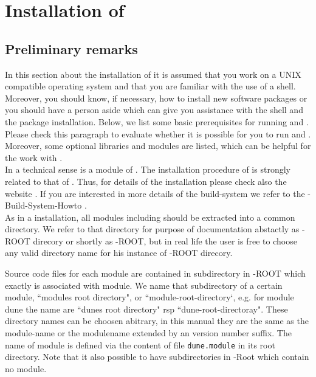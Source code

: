 \section{Installation of \Dumux} \label{install}
\subsection{Preliminary remarks}

In this section about the installation of \Dumux it is assumed that you work on a UNIX compatible operating system and that you are familiar with the use of a shell. 
Moreover, you should know,  if necessary, how to install new software packages or you should have a person aside which can give you assistance with the shell and the package installation. 
Below, we list some basic prerequisites for running \Dune and \Dumux. 
Please check this paragraph to evaluate whether it is possible for you to run \Dune and \Dumux. 
Moreover, some optional libraries and modules are listed, which can be helpful for the work with \Dumux. \\

In a technical sense \Dumux is a module of \Dune. 
The installation procedure of \Dumux is strongly related to that of \Dune. 
Thus, for details of the installation please check also the {\Dune} website \cite{DUNE-HP}. 
If you are interested in more details of the build-system we refer to the {\Dune}-Build-System-Howto \cite{DUNE-BS}.\\

As in a \Dune installation, all \Dune modules including \Dumux should be extracted into a common directory. We refer to that directory for purpose of documentation abstactly as {\Dune}-ROOT direcory or shortly as {\Dune}-ROOT, but in real life the user is free to choose any valid directory name for his instance of {\Dune}-ROOT direcory.

Source code files for each \Dune module are contained in subdirectory in {\Dune}-ROOT which exactly is associated with module.
We name that subdirectory of a certain module, ``modules root directory", or ``module-root-directory`, e.g. for module dune the name are  ``dunes root directory" rsp ``dune-root-directoray". These directory names can be choosen abitrary, in this manual they are the same as the module-name or the modulename extended by an version number suffix. The name of module is defined via the content of file \texttt{dune.module} in its root directory. Note that it also possible to have subdirectories in \Dune-Root which contain no module.

